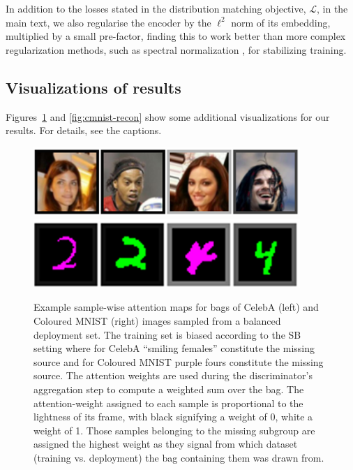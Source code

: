 In addition to the losses stated in the distribution matching objective, $\mathcal{L}$, in the main text, we also regularise the encoder by the $\ell^2$ norm of its embedding, multiplied by a small pre-factor, finding this to work better than more complex regularization methods, such as spectral normalization \citep{miyato2018spectral}, for stabilizing training.

\subsection{Visualizations of results}\label{sec:qual-results}
Figures~\ref{fig:attn_maps} and \ref{fig:cmnist-recon} show some additional visualizations for our results.
For details, see the captions.
\begin{figure}[tb]
  \centering
    \includegraphics[width=0.9\textwidth]{paper3/figures/celeba_attn_map.png}
    \includegraphics[width=0.9\textwidth]{paper3/figures/cmnist_attn_map.png}
  \caption{
    Example sample-wise attention maps for bags of CelebA (left) and Coloured MNIST (right) images sampled from a balanced deployment set. The training set is biased according to the SB setting where for CelebA ``smiling females'' constitute the missing source and for Coloured MNIST {\color{purple}purple} fours constitute the missing source. The attention weights are used during the discriminator's aggregation step to compute a weighted sum over the bag. The attention-weight assigned to each sample is proportional to the lightness of its frame, with black signifying a weight of 0, white a weight of 1. Those samples belonging to the missing subgroup are assigned the highest weight as they signal from which dataset (training vs. deployment) the bag containing them was drawn from.
  }%
  \label{fig:attn_maps}
\end{figure}

